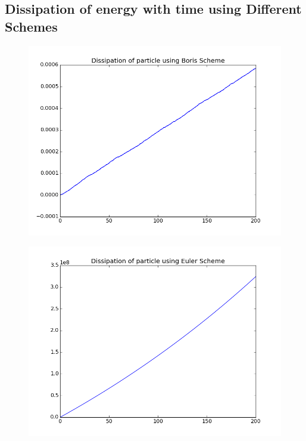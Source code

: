 \documentclass[11pt, a4paper]{article}
\begin{document}
\subsection{Dissipation of energy with time using Different Schemes}
\begin{figure}[H]
 \centering
 \includegraphics[width = \textwidth]{q1_dissipation_boris.png}
\end{figure}
\begin{figure}[H]
 \centering
 \includegraphics[width = \textwidth]{q1_dissipation_euler.png}
\end{figure}
\end{document}

